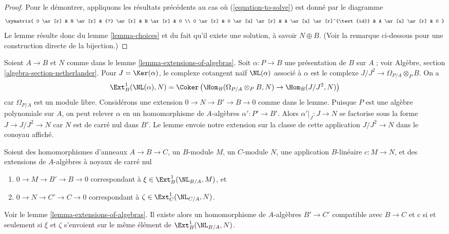 \begin{proof}
Pour le démontrer, appliquons les résultats précédents au cas où
(\ref{equation-to-solve}) est donné par le diagramme
$$
\xymatrix{
0 \ar[r] & N \ar[r] & {?} \ar[r] & B \ar[r] & 0 \\
0 \ar[r] & 0 \ar[u] \ar[r] & A \ar[u] \ar[r]^{\text{id}} & A \ar[u] \ar[r] & 0
}
$$
Le lemme résulte donc du lemme \ref{lemma-choices}
et du fait qu'il existe une solution, à savoir $N \oplus B$.
(Voir la remarque ci-dessous pour une construction directe de la bijection.)
\end{proof}

\begin{remark}
\label{remark-extensions-of-algebras}
Soient $A \to B$ et $N$ comme dans le lemme \ref{lemma-extensions-of-algebras}.
Soit $\alpha : P \to B$ une présentation de $B$ sur $A$ ; voir
Algèbre, section \ref{algebra-section-netherlander}.
Pour $J = \Ker(\alpha)$, le complexe cotangent naïf $\NL(\alpha)$
associé à $\alpha$ est le complexe $J/J^2 \to \Omega_{P/A} \otimes_P B$.
On a
$$
\Ext^1_B(\NL(\alpha), N) =
\Coker\left(\Hom_B(\Omega_{P/A} \otimes_P B, N) \to \Hom_B(J/J^2, N)\right)
$$
car $\Omega_{P/A}$ est un module libre.
Considérons une extension $0 \to N \to B' \to B \to 0$ comme dans le lemme.
Puisque $P$ est une algèbre polynomiale sur $A$, on peut
relever $\alpha$ en un homomorphisme de $A$-algèbres $\alpha' : P' \to B'$.
Alors $\alpha'|_J : J \to N$ se factorise sous la forme $J \to J/J^2 \to N$
car $N$ est de carré nul dans $B'$. Le lemme envoie notre extension
sur la classe de cette application $J/J^2 \to N$ dans le conoyau affiché.
\end{remark}












\begin{lemma}
\label{lemma-extensions-of-algebras-functorial}
Soient des homomorphismes d'anneaux $A \to B \to C$, un $B$-module $M$, un $C$-module $N$,
une application $B$-linéaire $c : M \to N$, et des extensions de
$A$-algèbres à noyaux de carré nul
\begin{enumerate}
\item[(a)] $0 \to M \to B' \to B \to 0$ correspondant à
$\xi \in \Ext^1_B(\NL_{B/A}, M)$, et
\item[(b)] $0 \to N \to C' \to C \to 0$ correspondant à
$\zeta \in \Ext^1_C(\NL_{C/A}, N)$.
\end{enumerate}
Voir le lemme \ref{lemma-extensions-of-algebras}.
Il existe alors un homomorphisme de $A$-algèbres $B' \to C'$ compatible avec
$B \to C$ et $c$ si et seulement si $\xi$ et $\zeta$
s'envoient sur le même élément de
$\Ext^1_B(\NL_{B/A}, N)$.
\end{lemma}

